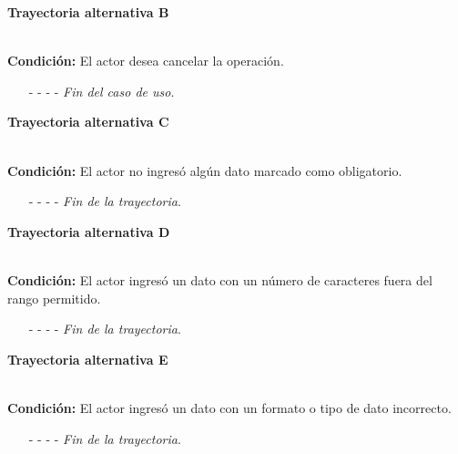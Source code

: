 \hypertarget{CU8-1:TAB}{\textbf{Trayectoria alternativa B}}\\
\noindent \textbf{Condición:} El actor desea cancelar la operación.
\begin{enumerate}
	\UCpaso[\UCactor] Solicita cancelar la operación oprimiendo el botón  de la pantalla 
	\UCpaso[\UCsist] Muestra la pantalla .
	\item[- -] - - {\em {Fin del caso de uso}}.%
\end{enumerate}
\hypertarget{CU8-1:TAC}{\textbf{Trayectoria alternativa C}}\\
\noindent \textbf{Condición:} El actor no ingresó algún dato marcado como obligatorio.
\begin{enumerate}
	\UCpaso[\UCsist] Muestra el mensaje  señalando el campo que presenta el error en la pantalla .
	\UCpaso Regresa al paso \ref{CU8.1-P3} de la trayectoria principal.
	\item[- -] - - {\em {Fin de la trayectoria}}.%
\end{enumerate}
\hypertarget{CU8-1:TAD}{\textbf{Trayectoria alternativa D}}\\
\noindent \textbf{Condición:} El actor ingresó un dato con un número de caracteres fuera del rango permitido.
\begin{enumerate}
	\UCpaso[\UCsist] Muestra el mensaje  señalando el campo que presenta el error en la pantalla .
	\UCpaso Regresa al paso \ref{CU8.1-P3} de la trayectoria principal.
	\item[- -] - - {\em {Fin de la trayectoria}}.%
\end{enumerate}
\hypertarget{CU8-1:TAE}{\textbf{Trayectoria alternativa E}}\\
\noindent \textbf{Condición:} El actor ingresó un dato con un formato o tipo de dato incorrecto.
\begin{enumerate}
	\UCpaso[\UCsist] Muestra el mensaje  señalando el campo que presenta el error en la pantalla .
	\UCpaso Regresa al paso \ref{CU8.1-P3} de la trayectoria principal.
	\item[- -] - - {\em {Fin de la trayectoria}}.
\end{enumerate}
